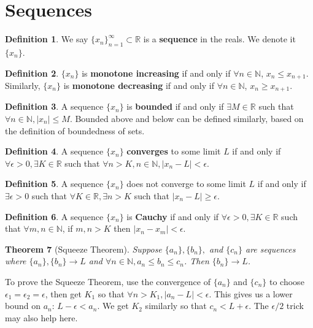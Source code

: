 \documentclass[11pt]{amsart}
\newtheorem{theorem}{Theorem}[section]
\theoremstyle{definition}
\newtheorem{definition}[theorem]{Definition}
\newcommand{\reals}{\mathbb{R}}
\newcommand{\naturals}{\mathbb{N}}
\newcommand{\seq}{\{ x_n \}}
\begin{document}
\section{Sequences}
\begin{definition}
	We say $\seq_{n = 1}^{\infty} \subset \reals$ is a \textbf{sequence} in the reals. We denote it $\seq$.
\end{definition}
\begin{definition}
	$\seq$ is \textbf{monotone increasing} if and only if $\forall n \in \naturals$, $x_n \leq x_{n+1}$. Similarly, $\seq$ is \textbf{monotone
	decreasing} if and only if $\forall n \in \naturals$, $x_n \geq x_{n+1}$.
\end{definition}
\begin{definition}
	A sequence $\seq$ is \textbf{bounded} if and only if $\exists M \in \reals$ such that $\forall n \in \naturals, | x_n | \leq M$. Bounded above
	and below can be defined similarly, based on the definition of boundedness of sets.
\end{definition}
\begin{definition}
	A sequence $\seq$ \textbf{converges} to some limit $L$ if and only if $\forall \epsilon > 0, \exists K \in \reals$ such that 
	$\forall n > K, n \in \naturals, | x_n - L | < \epsilon$.
\end{definition}
\begin{definition}
	A sequence $\seq$ does not converge to some limit $L$ if and only if $\exists \epsilon > 0$ such that 
	$\forall K \in \reals, \exists n > K$ such that $| x_n - L | \geq \epsilon$.
\end{definition}
\begin{definition}
	A sequence $\seq$ is \textbf{Cauchy} if and only if $\forall \epsilon > 0, \exists K \in \reals$ such that 
	$\forall m, n \in \naturals$, if $m, n > K$ then $| x_n - x_m | < \epsilon$.
\end{definition}
\begin{theorem}[Squeeze Theorem]
	Suppose $\{ a_n \}, \{ b_n \},$ and $\{ c_n \}$ are sequences where $\{ a_n \}, \{ b_n \} \to L$ and 
	$\forall n \in \naturals, a_n \leq b_n \leq c_n$. Then $\{ b_n \} \to L$.
\end{theorem}
To prove the Squeeze Theorem, use the convergence of $\{ a_n \}$ and $\{ c_n \}$ to choose $\epsilon_1 = \epsilon_2 = \epsilon$, then get
$K_1$ so that $\forall n > K_1, |a_n - L| < \epsilon$. This gives us a lower bound on $a_n$: $L - \epsilon < a_n$. We get $K_2$ similarly
so that $c_n < L + \epsilon$. The $\epsilon / 2$ trick may also help here.
\end{document}
